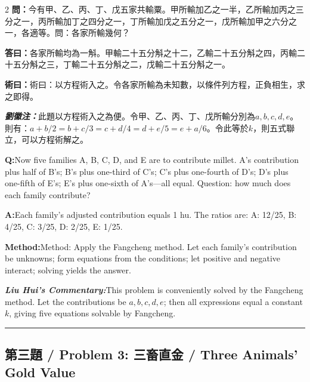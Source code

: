 \documentclass[11pt,a4paper]{article}
\newcommand{\cnwen}{\textcolor{cnlabelfg}{\textbf{問：}}}
\newcommand{\cnda}{\textbf{答曰：}}
\newcommand{\cnshu}{\textcolor{cnlabelfg}{\textbf{術曰：}}}
\newcommand{\cnzhu}{\textcolor{commentarycolor}{\textit{\textbf{劉徽注：}}}}
\newcommand{\enwen}{\textcolor{enlabelfg}{\textbf{Q:}}}
\newcommand{\enda}{\textcolor{enlabelfg}{\textbf{A:}}}
\newcommand{\enshu}{\textcolor{enlabelfg}{\textbf{Method:}}}
\newcommand{\enzhu}{\textcolor{enlabelfg}{\textit{\textbf{Liu Hui's Commentary:}}}}
\begin{document}
\begin{paracol}{2}
\switchcolumn[0]
\cnwen 今有甲、乙、丙、丁、戊五家共輸粟。甲所輸加乙之一半，乙所輸加丙之三分之一，丙所輸加丁之四分之一，丁所輸加戊之五分之一，戊所輸加甲之六分之一，各適等。問：各家所輸幾何？

\cnda 各家所輸均為一斛。甲輸二十五分斛之十二，乙輸二十五分斛之四，丙輸二十五分斛之三，丁輸二十五分斛之二，戊輸二十五分斛之一。

\cnshu 術曰：以方程術入之。令各家所輸為未知數，以條件列方程，正負相生，求之即得。

\cnzhu 此題以方程術入之為便。令甲、乙、丙、丁、戊所輸分別為$a, b, c, d, e$。則有：$a + b/2 = b + c/3 = c + d/4 = d + e/5 = e + a/6$。令此等於$k$，則五式聯立，可以方程術解之。

\switchcolumn[1]
\enwen Now five families A, B, C, D, and E are to contribute millet. A's contribution plus half of B's; B's plus one-third of C's; C's plus one-fourth of D's; D's plus one-fifth of E's; E's plus one-sixth of A's---all equal. Question: how much does each family contribute?

\enda Each family's adjusted contribution equals 1 hu. The ratios are: A: 12/25, B: 4/25, C: 3/25, D: 2/25, E: 1/25.

\enshu Method: Apply the Fangcheng method. Let each family's contribution be unknowns; form equations from the conditions; let positive and negative interact; solving yields the answer.

\enzhu This problem is conveniently solved by the Fangcheng method. Let the contributions be $a, b, c, d, e$; then all expressions equal a constant $k$, giving five equations solvable by Fangcheng.
\end{paracol}

\bigskip\hrule\bigskip

\subsection{第三題 / Problem 3: 三畜直金 / Three Animals' Gold Value}
\end{document}
